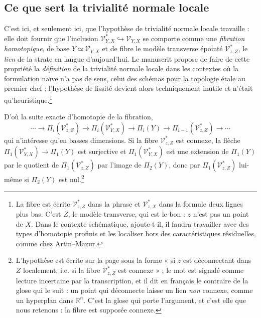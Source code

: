 \documentclass[11pt,a4paper]{article}
\begin{document}
\subsection*{Ce que sert la trivialité normale locale}

C'est ici, et seulement ici, que l'hypothèse de trivialité normale locale
travaille : elle doit fournir que l'inclusion
$\mathcal{V}^{*}_{Y,X} \hookrightarrow \mathcal{V}_{Y,X}$ se comporte comme une
\emph{fibration homotopique}, de base $Y \simeq \mathcal{V}_{Y,X}$ et de fibre
le modèle transverse épointé $\mathcal{V}^{*}_{z,Z}$, le \emph{lien} de la
strate en langue d'aujourd'hui. Le manuscrit propose de faire de cette
propriété la \emph{définition} de la trivialité normale locale dans les
contextes où la formulation naïve n'a pas de sens, celui des schémas pour la
topologie étale au premier chef ; l'hypothèse de lissité devient alors
techniquement inutile et n'était qu'heuristique.\footnote{La fibre est écrite
$\mathcal{V}^{*}_{z,Z}$ dans la phrase et $\mathcal{V}^{*}_{z,X}$ dans la
formule deux lignes plus bas. C'est $Z$, le modèle transverse, qui est le bon :
$z$ n'est pas un point de $X$. Dans le contexte schématique, ajoute-t-il, il
faudra travailler avec des types d'homotopie profinis et les localiser hors des
caractéristiques résiduelles, comme chez Artin--Mazur.}

D'où la suite exacte d'homotopie de la fibration,
\[
  \cdots \to \Pi_{i}(\mathcal{V}^{*}_{z,Z}) \to
  \Pi_{i}(\mathcal{V}^{*}_{Y,X}) \to \Pi_{i}(Y) \to
  \Pi_{i-1}(\mathcal{V}^{*}_{z,Z}) \to \cdots
\]
qui n'intéresse qu'en basses dimensions. Si la fibre $\mathcal{V}^{*}_{z,Z}$ est
connexe, la flèche $\Pi_{1}(\mathcal{V}^{*}_{Y,X}) \to \Pi_{1}(Y)$ est
surjective et $\Pi_{1}(\mathcal{V}^{*}_{Y,X})$ est une extension de $\Pi_{1}(Y)$
par le quotient de $\Pi_{1}(\mathcal{V}^{*}_{z,Z})$ par l'image de
$\Pi_{2}(Y)$, donc par $\Pi_{1}(\mathcal{V}^{*}_{z,Z})$ lui-même si
$\Pi_{2}(Y)$ est nul.\footnote{L'hypothèse est écrite sur la page sous la forme
« si $z$ est déconnectant dans $Z$ localement, i.e. si la fibre
$\mathcal{V}^{*}_{z,Z}$ est connexe » ; le mot est signalé comme lecture
incertaine par la transcription, et il dit en français le contraire de la glose
qui le suit : un point qui déconnecte laisse un lien \emph{non} connexe, comme
un hyperplan dans $\mathbb{R}^{n}$. C'est la glose qui porte l'argument, et
c'est elle que nous retenons : la fibre est supposée connexe.}
\end{document}
